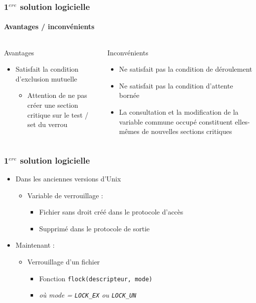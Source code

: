 \begin{frame}
\frametitle{1$^{ere}$ solution logicielle}
\framesubtitle{Avantages / inconvénients}
\begin{columns}
\begin{block}{Avantages}
\begin{itemize}
\item Satisfait la condition d’exclusion mutuelle
\begin{itemize}
\item Attention de ne pas créer une section critique sur le test / set du verrou
\end{itemize}

\end{itemize}
\end{block}
\begin{block}{Inconvénients}
\begin{itemize}
\item Ne satisfait pas la condition de déroulement
\item Ne satisfait pas la condition d’attente bornée
\item La consultation et la modification de la variable commune occupé constituent elles-mêmes de nouvelles sections critiques
\end{itemize}
\end{block}
\end{columns}
\end{frame}

\begin{frame}
\frametitle{1$^{ere}$ solution logicielle}
\begin{itemize}
\item Dans les anciennes versions d’Unix
\begin{itemize}
\item Variable de verrouillage :
\begin{itemize}
\item Fichier sans droit créé dans le protocole d’accès
\item Supprimé dans le protocole de sortie
\end{itemize}
\end{itemize}
\item Maintenant :
\begin{itemize}
\item Verrouillage d’un fichier
\begin{itemize}
\item Fonction \texttt{flock(descripteur, mode)}
\item \textit{où mode = \texttt{LOCK\_EX} ou \texttt{LOCK\_UN}}
\end{itemize}
\end{itemize}
\end{itemize}
\end{frame}

